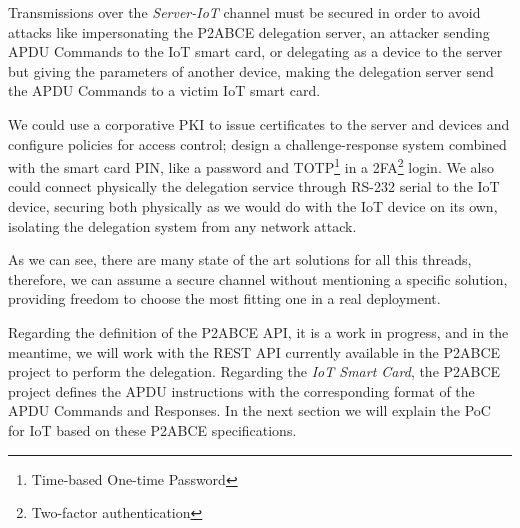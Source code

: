 Transmissions over the \textit{Server-IoT} channel must be secured in order to avoid attacks like impersonating the P2ABCE delegation server, an attacker sending APDU Commands to the IoT smart card, or delegating as a device to the server but giving the parameters of another device, making the delegation server send the APDU Commands to a victim IoT smart card.


We could use a corporative PKI to issue certificates to the server and devices and configure policies for access control; design a challenge-response system combined with the smart card PIN, like a password and TOTP\footnote{Time-based One-time Password} in a 2FA\footnote{Two-factor authentication} login. We also could connect physically the delegation service through RS-232 serial to the IoT device, securing both physically as we would do with the IoT device on its own, isolating the delegation system from any network attack. %

As we can see, there are many state of the art solutions for all this threads, therefore, we can assume a secure channel without mentioning a specific solution, providing freedom to choose the most fitting one in a real deployment.


\hfil

Regarding the definition of the P2ABCE API, it is a work in progress, and in the meantime, we will work with the REST API currently available in the P2ABCE project to perform the delegation. Regarding the \textit{IoT Smart Card}, the P2ABCE project defines the APDU instructions with the corresponding format of the APDU Commands and Responses. In the next section we will explain the PoC for IoT based on these P2ABCE specifications.





